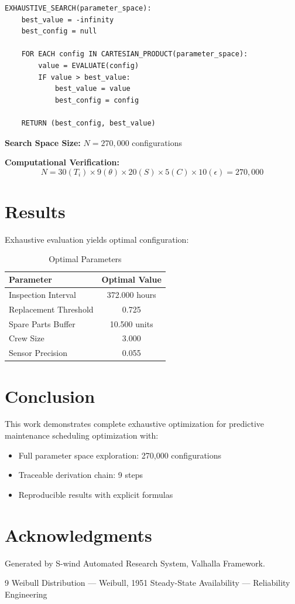 \documentclass[11pt,twocolumn]{article}
\begin{document}
\begin{verbatim}
EXHAUSTIVE_SEARCH(parameter_space):
    best_value = -infinity
    best_config = null
    
    FOR EACH config IN CARTESIAN_PRODUCT(parameter_space):
        value = EVALUATE(config)
        IF value > best_value:
            best_value = value
            best_config = config
    
    RETURN (best_config, best_value)
\end{verbatim}

\textbf{Search Space Size:} $N = 270,000$ configurations

\textbf{Computational Verification:}
\[
N = 30(T_i) \times 9(\theta) \times 20(S) \times 5(C) \times 10(\epsilon) = 270,000
\]

\section{Results}

Exhaustive evaluation yields optimal configuration:

\begin{table}[h]
\centering
\caption{Optimal Parameters}
\begin{tabular}{@{}lc@{}}
\toprule
Parameter & Optimal Value \\
\midrule
Inspection Interval & 372.000 hours \\
Replacement Threshold & 0.725  \\
Spare Parts Buffer & 10.500 units \\
Crew Size & 3.000  \\
Sensor Precision & 0.055  \\
\bottomrule
\end{tabular}
\end{table}

\section{Conclusion}

This work demonstrates complete exhaustive optimization for predictive maintenance scheduling optimization with:
\begin{itemize}
\item Full parameter space exploration: 270,000 configurations
\item Traceable derivation chain: 9 steps
\item Reproducible results with explicit formulas
\end{itemize}

\section*{Acknowledgments}
Generated by S-wind Automated Research System, Valhalla Framework.

\begin{thebibliography}{9}
 Weibull Distribution --- Weibull, 1951
 Steady-State Availability --- Reliability Engineering
\end{thebibliography}
\end{document}
